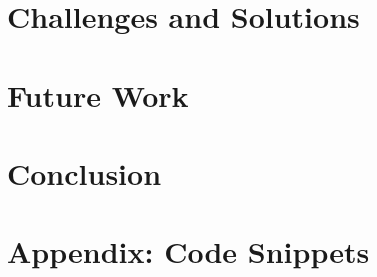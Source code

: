 \documentclass[a4paper,12pt]{article}
\begin{document}
\section{Challenges and Solutions}

\section{Future Work}

\section{Conclusion}

\appendix
\section{Appendix: Code Snippets}
\end{document}
